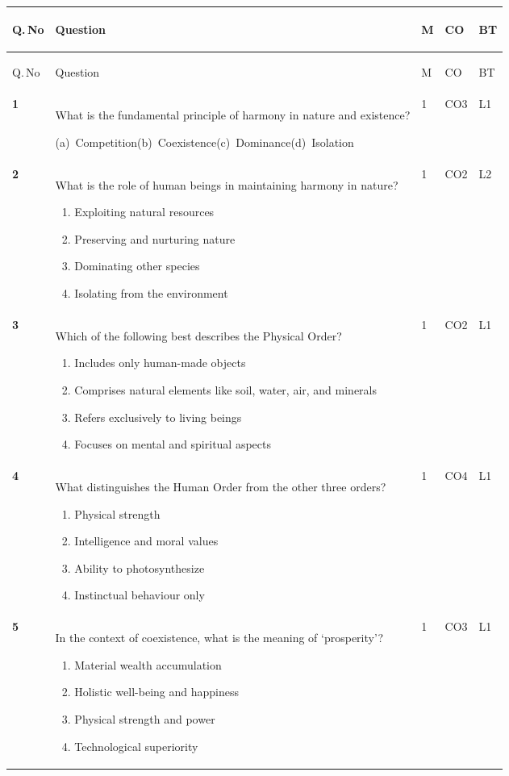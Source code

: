 \documentclass[11pt,a4paper,oneside]{book}
\newcommand{\optsinline}[4]{\par\vspace{3pt}%
  {\small\color{slate}(a)~#1\quad (b)~#2\quad (c)~#3\quad (d)~#4}}
\newenvironment{optlist}
  {\par\vspace{2pt}\begingroup\small\color{slate}%
   \begin{enumerate}[label={\color{slatelight}(\alph*)},leftmargin=2.0em,
     itemsep=1pt,topsep=2pt,parsep=0pt]}
  {\end{enumerate}\endgroup\vspace{1pt}}
\newcommand{\hdr}[1]{{\sffamily\bfseries\color{white}\strut #1}}
\newenvironment{qtable}
  {\renewcommand{\arraystretch}{1.28}%
   \arrayrulecolor{rulegrey}%
   \setlength{\LTpre}{6pt}\setlength{\LTpost}{4pt}%
   \begin{longtable}{C{11mm} P{108mm} C{10mm} C{12mm} C{9mm}}
   \rowcolor{slate}
   \hdr{Q.\,No} & \hdr{Question} & \hdr{M} & \hdr{CO} & \hdr{BT}
   \\ \hline \endfirsthead
   \rowcolor{slate}
   \hdr{Q.\,No} & \hdr{Question} & \hdr{M} & \hdr{CO} & \hdr{BT}
   \\ \hline \endhead}
  {\end{longtable}}
\newcommand{\qn}[1]{{\sffamily\bfseries\color{ocre}#1}}
\begin{document}
\begin{qtable}
\qn{1} & What is the fundamental principle of harmony in nature and existence?
  \optsinline{Competition}{Coexistence}{Dominance}{Isolation}
  & 1 & CO3 & L1 \\ \hline
\qn{2} & What is the role of human beings in maintaining harmony in nature?
  \begin{optlist}
  \item Exploiting natural resources
  \item Preserving and nurturing nature
  \item Dominating other species
  \item Isolating from the environment
  \end{optlist}
  & 1 & CO2 & L2 \\ \hline
\qn{3} & Which of the following best describes the Physical Order?
  \begin{optlist}
  \item Includes only human-made objects
  \item Comprises natural elements like soil, water, air, and minerals
  \item Refers exclusively to living beings
  \item Focuses on mental and spiritual aspects
  \end{optlist}
  & 1 & CO2 & L1 \\ \hline
\qn{4} & What distinguishes the Human Order from the other three orders?
  \begin{optlist}
  \item Physical strength
  \item Intelligence and moral values
  \item Ability to photosynthesize
  \item Instinctual behaviour only
  \end{optlist}
  & 1 & CO4 & L1 \\ \hline
\qn{5} & In the context of coexistence, what is the meaning of `prosperity'?
  \begin{optlist}
  \item Material wealth accumulation
  \item Holistic well-being and happiness
  \item Physical strength and power
  \item Technological superiority
  \end{optlist}
  & 1 & CO3 & L1 \\ \hline
\end{qtable}
\end{document}
